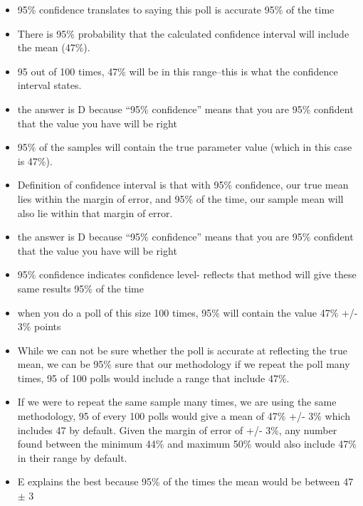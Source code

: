 \documentclass[letterpaper,9pt,twoside,printwatermark=false]{pinp}
\providecommand{\tightlist}{%
  \setlength{\itemsep}{0pt}\setlength{\parskip}{0pt}}
\begin{document}
\begin{itemize}
\tightlist
\item
  95\% confidence translates to saying this poll is accurate 95\% of the
  time
\item
  There is 95\% probability that the calculated confidence interval will
  include the mean (47\%).
\item
  95 out of 100 times, 47\% will be in this range--this is what the
  confidence interval states.
\item
  the answer is D because ``95\% confidence'' means that you are 95\%
  confident that the value you have will be right
\item
  95\% of the samples will contain the true parameter value (which in
  this case is 47\%).
\item
  Definition of confidence interval is that with 95\% confidence, our
  true mean lies within the margin of error, and 95\% of the time, our
  sample mean will also lie within that margin of error.
\item
  the answer is D because ``95\% confidence'' means that you are 95\%
  confident that the value you have will be right
\item
  95\% confidence indicates confidence level- reflects that method will
  give these same results 95\% of the time
\item
  when you do a poll of this size 100 times, 95\% will contain the value
  47\% +/- 3\% points
\item
  While we can not be sure whether the poll is accurate at reflecting
  the true mean, we can be 95\% sure that our methodology if we repeat
  the poll many times, 95 of 100 polls would include a range that
  include 47\%.
\item
  If we were to repeat the same sample many times, we are using the same
  methodology, 95 of every 100 polls would give a mean of 47\% +/- 3\%
  which includes 47 by default. Given the margin of error of +/- 3\%,
  any number found between the minimum 44\% and maximum 50\% would also
  include 47\% in their range by default.
\item
  E explains the best because 95\% of the times the mean would be
  between 47 \(\pm\) 3
\end{itemize}





\end{document}
